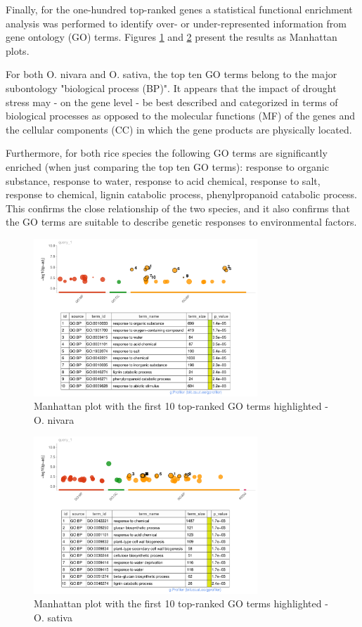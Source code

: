 Finally, for the one-hundred top-ranked genes a statistical functional enrichment analysis was performed to identify over- or under-represented information from gene ontology (GO) terms. Figures \ref{fig:5.2-Gost-Plot-Oryza_nivara} and \ref{fig:5.2-Gost-Plot-Oryza_sativa} present the results as Manhattan plots.

For both O. nivara and O. sativa, the top ten GO terms belong to the major subontology "biological process (BP)". It appears that the impact of drought stress may - on the gene level - be best described and categorized in terms of biological processes as opposed to the molecular functions (MF) of the genes and the cellular components (CC) in which the gene products are physically located.

Furthermore, for both rice species the following GO terms are significantly enriched (when just comparing the top ten GO terms): response to organic substance, response to water, response to acid chemical, response to salt, response to chemical, lignin catabolic process, phenylpropanoid catabolic process. This confirms the close relationship of the two species, and it also confirms that the GO terms are suitable to describe genetic responses to environmental factors.

\begin{figure}[htbp]
    \caption{Manhattan plot with the first 10 top-ranked GO terms highlighted - O. nivara}
    \label{fig:5.2-Gost-Plot-Oryza_nivara}
    \includegraphics[width=0.75\textwidth]{../../results/plots-and-tables/5.2-Gost-Plot-Oryza_nivara}
\end{figure}

\begin{figure}[htbp]
    \caption{Manhattan plot with the first 10 top-ranked GO terms highlighted - O. sativa}
    \label{fig:5.2-Gost-Plot-Oryza_sativa}
    \includegraphics[width=0.75\textwidth]{../../results/plots-and-tables/5.2-Gost-Plot-Oryza_sativa}
\end{figure}